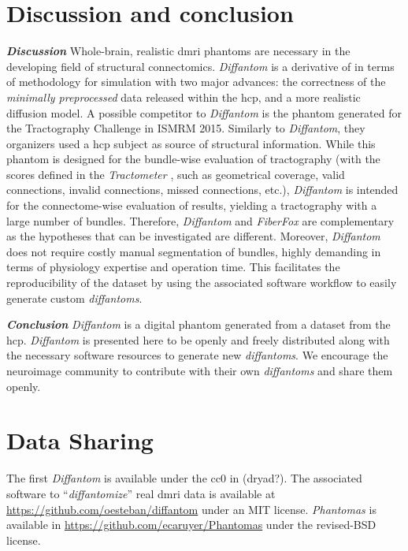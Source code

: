 \documentclass[english]{frontiers/frontiersSCNS} %
\begin{document}
\section*{Discussion and conclusion}
\noindent\textbf{\textit{Discussion\textcolon}}\label{sec:discussion} %
Whole-brain, realistic \gls*{dmri} phantoms are necessary in the developing field of structural
  connectomics.
\emph{Diffantom} is a derivative of \citep{wilkins_fiber_2014} in terms of methodology for
  simulation with two major advances: the correctness of the \emph{minimally preprocessed} data
  \citep{glasser_minimal_2013} released within the \gls*{hcp}, and a more realistic diffusion
  model.
A possible competitor to \emph{Diffantom} is the phantom generated for the Tractography Challenge in
  ISMRM 2015.
Similarly to \emph{Diffantom}, they organizers used a \gls*{hcp} subject as source of structural information.
While this phantom is designed for the bundle-wise evaluation of tractography (with the scores defined in the
  \emph{Tractometer} \citep{cote_tractometer_2013}, such as geometrical coverage, valid connections, invalid connections,
  missed connections, etc.), \emph{Diffantom} is intended for the connectome-wise evaluation of results,
  yielding a tractography with a large number of bundles.
Therefore, \emph{Diffantom} and \emph{FiberFox} are complementary as the hypotheses that can be investigated are different.
Moreover, \emph{Diffantom} does not require costly manual segmentation of bundles, highly demanding in terms of physiology
  expertise and operation time.
This facilitates the reproducibility of the dataset by using the associated software workflow to easily
  generate custom \emph{diffantoms}.

\noindent\textbf{\textit{Conclusion\textcolon}}\label{sec:conclusion} %
\emph{Diffantom} is a digital phantom generated from a dataset from the \acrlong*{hcp}.
\emph{Diffantom} is presented here to be openly and freely distributed along with the necessary
  software resources to generate new \emph{diffantoms}.
We encourage the neuroimage community to contribute with their own \emph{diffantoms} and share them openly.


\section*{Data Sharing}
The first \emph{Diffantom} is available under the \gls*{cc0} in {\color{red} (dryad?)}.
The associated software to ``\emph{diffantomize}'' real \gls*{dmri} data is available at \url{https://github.com/oesteban/diffantom}
  under an MIT license.
\emph{Phantomas} is available in \url{https://github.com/ecaruyer/Phantomas} under the revised-BSD license.
\end{document}
